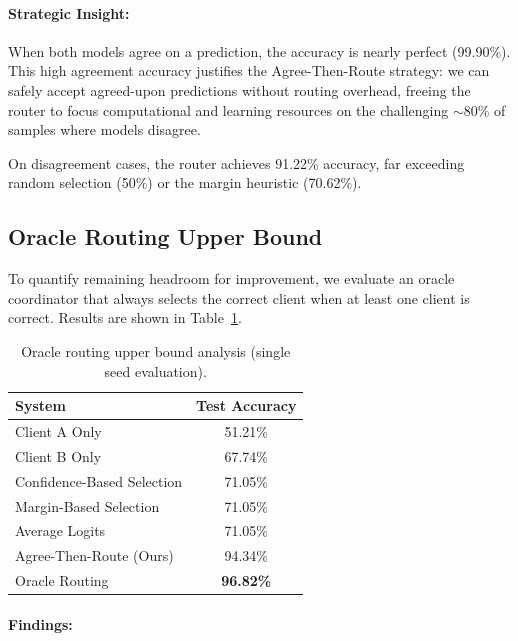 \documentclass[12pt]{article}
\begin{document}
\paragraph{Strategic Insight:}

When both models agree on a prediction, the accuracy is nearly perfect (99.90\%). This high agreement accuracy justifies the Agree-Then-Route strategy: we can safely accept agreed-upon predictions without routing overhead, freeing the router to focus computational and learning resources on the challenging $\sim$80\% of samples where models disagree.

On disagreement cases, the router achieves 91.22\% accuracy, far exceeding random selection (50\%) or the margin heuristic (70.62\%).

\subsection{Oracle Routing Upper Bound}

To quantify remaining headroom for improvement, we evaluate an oracle coordinator that always selects the correct client when at least one client is correct. Results are shown in Table~\ref{tab:oracle}.

\begin{table}[h]
\centering
\caption{Oracle routing upper bound analysis (single seed evaluation).}
\label{tab:oracle}
\begin{tabular}{lc}
\toprule
\textbf{System} & \textbf{Test Accuracy} \\
\midrule
Client A Only & 51.21\% \\
Client B Only & 67.74\% \\
Confidence-Based Selection & 71.05\% \\
Margin-Based Selection & 71.05\% \\
Average Logits & 71.05\% \\
Agree-Then-Route (Ours) & 94.34\% \\
\midrule
Oracle Routing & \textbf{96.82\%} \\
\bottomrule
\end{tabular}
\end{table}

\paragraph{Findings:}
\end{document}
